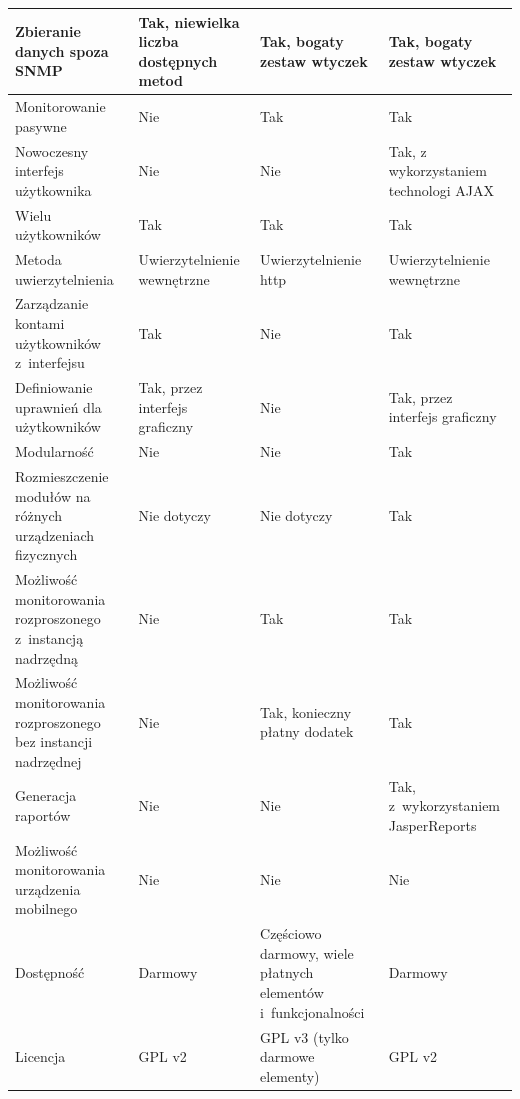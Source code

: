 \begin{longtable}[c]{|p{4.5cm}||p{3cm}|p{3cm}|p{3cm}|}
  \raggedright{Zbieranie danych spoza SNMP} & \raggedright{Tak, niewielka liczba dostępnych metod} &
  \raggedright{Tak, bogaty zestaw wtyczek} & \raggedright{Tak, bogaty zestaw wtyczek}
  \tabularnewline
  \hline

  \raggedright{Monitorowanie pasywne} & \raggedright{Nie} &
  \raggedright{Tak} & \raggedright{Tak}
  \tabularnewline
  \hline

  \raggedright{Nowoczesny interfejs użytkownika} & \raggedright{Nie} &
  \raggedright{Nie} & \raggedright{Tak, z wykorzystaniem technologi AJAX}
  \tabularnewline
  \hline

  \raggedright{Wielu użytkowników} & \raggedright{Tak} &
  \raggedright{Tak} & \raggedright{Tak}
  \tabularnewline
  \hline

  \raggedright{Metoda uwierzytelnienia} & \raggedright{Uwierzytelnienie wewnętrzne} &
  \raggedright{Uwierzytelnienie http} & \raggedright{Uwierzytelnienie wewnętrzne}
  \tabularnewline
  \hline

  \raggedright{Zarządzanie kontami użytkowników z~interfejsu} & \raggedright{Tak} &
  \raggedright{Nie} & \raggedright{Tak}
  \tabularnewline
  \hline

  \raggedright{Definiowanie uprawnień dla użytkowników} & \raggedright{Tak, przez interfejs graficzny} &
  \raggedright{Nie} & \raggedright{Tak, przez interfejs graficzny}
  \tabularnewline
  \hline

  \raggedright{Modularność} & \raggedright{Nie} &
  \raggedright{Nie} & \raggedright{Tak}
  \tabularnewline
  \hline

  \raggedright{Rozmieszczenie modułów na różnych urządzeniach fizycznych} & \raggedright{Nie dotyczy} &
  \raggedright{Nie dotyczy} & \raggedright{Tak}
  \tabularnewline
  \hline

  \raggedright{Możliwość monitorowania rozproszonego z~instancją
    nadrzędną} & \raggedright{Nie} & \raggedright{Tak} &
  \raggedright{Tak}
  \tabularnewline
  \hline

  \raggedright{Możliwość monitorowania rozproszonego bez instancji nadrzędnej} & \raggedright{Nie} &
  \raggedright{Tak, konieczny płatny dodatek} & \raggedright{Tak}
  \tabularnewline
  \hline

  \raggedright{Generacja raportów} & \raggedright{Nie} &
  \raggedright{Nie} & \raggedright{Tak, z~wykorzystaniem JasperReports}
  \tabularnewline
  \hline

  \raggedright{Możliwość monitorowania urządzenia mobilnego} & \raggedright{Nie} &
  \raggedright{Nie} & \raggedright{Nie}
  \tabularnewline
  \hline

  \raggedright{Dostępność} & \raggedright{Darmowy} &
  \raggedright{Częściowo darmowy, wiele płatnych elementów i~funkcjonalności} & \raggedright{Darmowy}
  \tabularnewline
  \hline

  \raggedright{Licencja} & \raggedright{GPL v2} &
  \raggedright{GPL v3 (tylko darmowe elementy)} & \raggedright{GPL v2}
  \tabularnewline
  \hline

\end{longtable}

